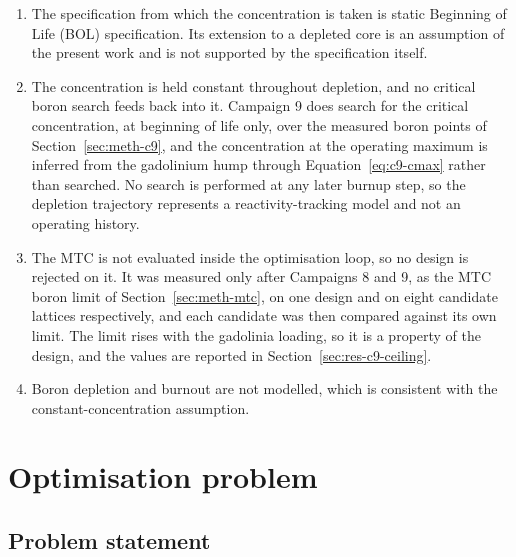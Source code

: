 \begin{enumerate}
  \item The specification from which the concentration is taken is static
        Beginning of Life (BOL) specification. Its extension to a
        depleted core is an assumption of the present work and is not
        supported by the specification itself.
  \item The concentration is held constant throughout depletion, and no
        critical boron search feeds back into it. Campaign 9 does search
        for the critical concentration, at beginning of life only, over
        the measured boron points of Section~\ref{sec:meth-c9}, and the
        concentration at the operating maximum is inferred from the
        gadolinium hump through Equation~\eqref{eq:c9-cmax} rather than
        searched. No search is performed at any later burnup step, so
        the depletion trajectory represents a reactivity-tracking model
        and not an operating history.
  \item The MTC is not evaluated inside the optimisation loop, so no
        design is rejected on it. It was measured only after Campaigns 8
        and 9, as the MTC boron limit of
        Section~\ref{sec:meth-mtc}, on one design and on eight candidate
        lattices respectively, and each candidate was then compared
        against its own limit. The limit rises with the gadolinia
        loading, so it is a property of the design, and the values are
        reported in Section~\ref{sec:res-c9-ceiling}.
  \item Boron depletion and  burnout are not modelled,
        which is consistent with the constant-concentration assumption.
\end{enumerate}

\label{sec:meth-boron-worth}\label{eq:rho-def}\label{eq:boron-worth}\label{eq:rod-only-margin}\label{eq:boron-share}

\section{Optimisation problem}
\label{sec:meth-problem}

\subsection{Problem statement}

